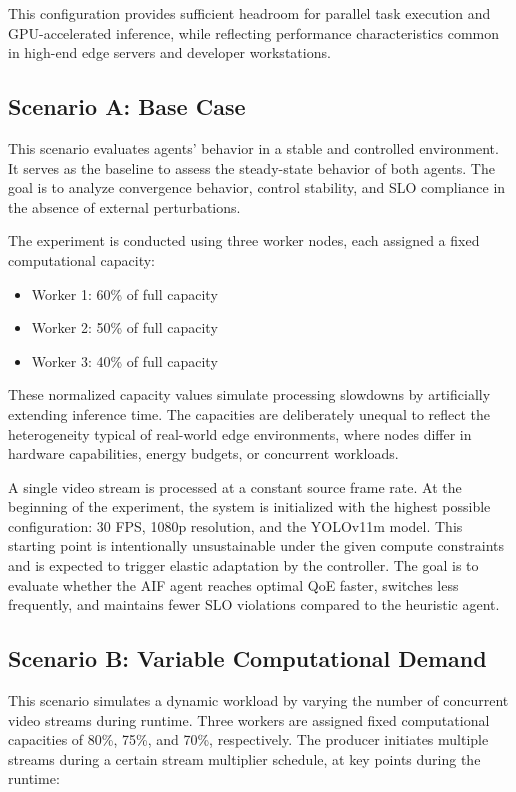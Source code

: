 This configuration provides sufficient headroom for parallel task execution and GPU-accelerated inference, while reflecting performance characteristics common in high-end edge servers and developer workstations.

\subsection{Scenario A: Base Case}
\label{sec:evaluation-base}

This scenario evaluates agents' behavior in a stable and controlled environment. It serves as the baseline to assess the steady-state behavior of both agents. The goal is to analyze convergence behavior, control stability, and SLO compliance in the absence of external perturbations.

The experiment is conducted using three worker nodes, each assigned a fixed computational capacity:
\begin{itemize}
    \item Worker 1: 60\% of full capacity
    \item Worker 2: 50\% of full capacity
    \item Worker 3: 40\% of full capacity
\end{itemize}

These normalized capacity values simulate processing slowdowns by artificially extending inference time. The capacities are deliberately unequal to reflect the heterogeneity typical of real-world edge environments, where nodes differ in hardware capabilities, energy budgets, or concurrent workloads.

A single video stream is processed at a constant source frame rate. At the beginning of the experiment, the system is initialized with the highest possible configuration: 30 FPS, 1080p resolution, and the YOLOv11m model. This starting point is intentionally unsustainable under the given compute constraints and is expected to trigger elastic adaptation by the controller. The goal is to evaluate whether the AIF agent reaches optimal QoE faster, switches less frequently, and maintains fewer SLO violations compared to the heuristic agent.

\subsection{Scenario B: Variable Computational Demand}
\label{sec:evaluation-variable-demand}

This scenario simulates a dynamic workload by varying the number of concurrent video streams during runtime. Three workers are assigned fixed computational capacities of 80\%, 75\%, and 70\%, respectively. The producer initiates multiple streams during a certain stream multiplier schedule, at key points during the runtime:

